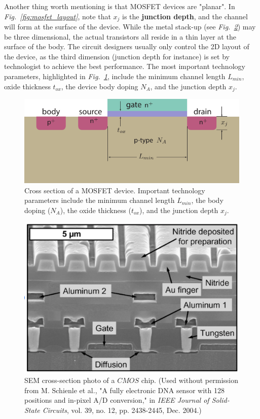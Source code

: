 Another thing worth mentioning is that MOSFET devices are "planar".  In \emph{Fig.~\ref{fig:mosfet_layout}}, note that $x_j$ is the \textbf{junction depth}, and the channel will form at the surface of the device.  While the metal stack-up (see \emph{Fig.~\ref{fig:cmos_photo}}) may be three dimensional, the actual transistors all reside in a thin layer at the surface of the body.  The circuit designers usually only control the 2D layout of the device, as the third dimension (junction depth for instance) is set by technologist to achieve the best performance.  The most important technology parameters, highlighted in \emph{Fig.~\ref{fig:mos_tech}}, include the minimum channel length $L_{min}$, oxide thickness $t_{ox}$, the device body doping $N_A$, and the junction depth $x_j$.
\newpage
\begin{figure}[t]
\centering
\includegraphics[width=\columnwidth]{mos_tech}
\caption{Cross section of a MOSFET device. Important technology parameters include the minimum channel length $L_{min}$, the body doping ($N_A$), the oxide thickness ($t_{ox}$), and the junction depth $x_j$.}
\label{fig:mos_tech}
\end{figure}
\begin{figure}[H]
\centering
\includegraphics[width=.85\columnwidth]{cmos_xsection_photo.png}
\caption{SEM cross-section photo of a $CMOS$ chip. {\small(Used without permission from M. Schienle et al., "A fully electronic DNA sensor with 128 positions and in-pixel A/D conversion," in \emph{IEEE Journal of Solid-State Circuits}, vol. 39, no. 12, pp. 2438-2445, Dec. 2004.)}}
\label{fig:cmos_photo}
\end{figure}

